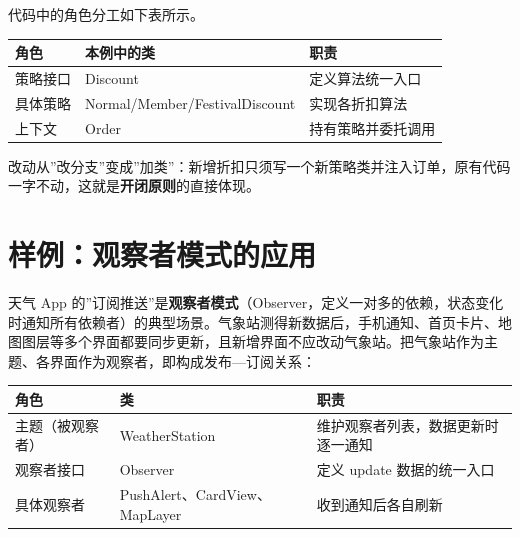 \documentclass[
]{ctexbook}
\newcounter{none}
\begin{document}
代码中的角色分工如下表所示。

{\def\LTcaptype{none} %
\begin{longtable}[]{@{}lll@{}}
\toprule\noalign{}
角色 & 本例中的类 & 职责 \\
\midrule\noalign{}
\endhead
\bottomrule\noalign{}
\endlastfoot
策略接口 & Discount & 定义算法统一入口 \\
具体策略 & Normal/Member/FestivalDiscount & 实现各折扣算法 \\
上下文 & Order & 持有策略并委托调用 \\
\end{longtable}
}

改动从''改分支''变成''加类''：新增折扣只须写一个新策略类并注入订单，原有代码一字不动，这就是\textbf{开闭原则}的直接体现。

\section{样例：观察者模式的应用}\label{ux6837ux4f8bux89c2ux5bdfux8005ux6a21ux5f0fux7684ux5e94ux7528}

天气 App
的''订阅推送''是\textbf{观察者模式}（Observer，定义一对多的依赖，状态变化时通知所有依赖者）的典型场景。气象站测得新数据后，手机通知、首页卡片、地图图层等多个界面都要同步更新，且新增界面不应改动气象站。把气象站作为主题、各界面作为观察者，即构成发布---订阅关系：

{\def\LTcaptype{none} %
\begin{longtable}[]{@{}
  >{\raggedright\arraybackslash}p{}
  >{\raggedright\arraybackslash}p{}
  >{\raggedright\arraybackslash}p{}@{}}
\toprule\noalign{}
\begin{minipage}[b]{\linewidth}\raggedright
角色
\end{minipage} & \begin{minipage}[b]{\linewidth}\raggedright
类
\end{minipage} & \begin{minipage}[b]{\linewidth}\raggedright
职责
\end{minipage} \\
\midrule\noalign{}
\endhead
\bottomrule\noalign{}
\endlastfoot
主题（被观察者） & WeatherStation &
维护观察者列表，数据更新时逐一通知 \\
观察者接口 & Observer & 定义 update 数据的统一入口 \\
具体观察者 & PushAlert、CardView、MapLayer & 收到通知后各自刷新 \\
\end{longtable}
}
\end{document}
